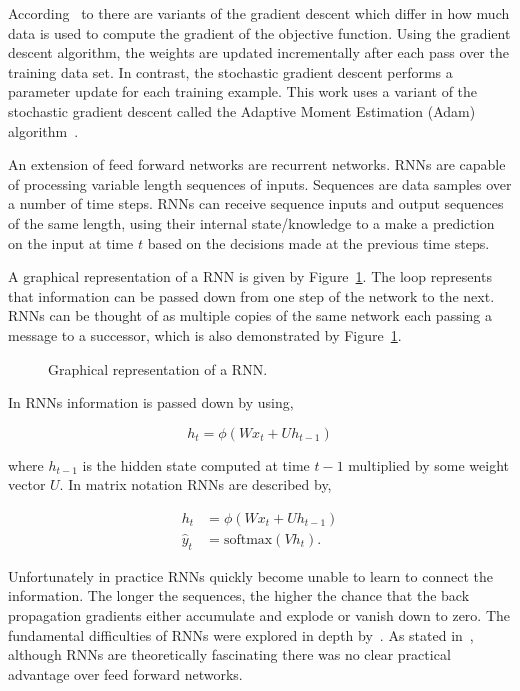 According~\cite{Ruder2016} to there are variants of the gradient descent which
differ in how much data is used to compute the gradient of the objective
function. Using the gradient descent algorithm, the weights are updated
incrementally after each pass over the training data set. In contrast, the
stochastic gradient descent performs a parameter update for each training
example. This work uses a variant of the stochastic gradient descent called the
Adaptive Moment Estimation (Adam) algorithm~\cite{Kingma2014}.

An extension of feed forward networks are recurrent networks. RNNs are
capable of processing variable length sequences of inputs. Sequences are data
samples over a number of time steps. RNNs can receive sequence inputs and output
sequences of the same length, using their internal state/knowledge to a make a
prediction on the input at time \(t\) based on the decisions made at the
previous time steps.

A graphical representation of a RNN is given by
Figure~\ref{fig:rnn}. The loop represents that information can be passed
down from one step of the network to the next. RNNs can be thought of as
multiple copies of the same network each passing a message to a successor, which
is also demonstrated by Figure~\ref{fig:rnn}.

\begin{figure}[!htbp]
    \centering
    
    \caption{Graphical representation of a RNN.}\label{fig:rnn}
\end{figure}

In RNNs information is passed down by using,

\begin{equation*}
    h_t = \phi(Wx_t + Uh_{t-1})
\end{equation*}

where \(h_{t-1}\) is the hidden state computed at time \(t-1\) multiplied by
some weight vector \(U\). In matrix notation RNNs are described by,

\begin{align}\label{eq:recurrent_neural_network_equations}
    h_t & = \phi(Wx_t + Uh_{t-1}) \\
    \hat{y}_t & = \text{softmax}(Vh_t).
\end{align}

Unfortunately in practice RNNs quickly become unable to learn to connect the
information. The longer the sequences, the higher the chance that
the back propagation gradients either accumulate and explode or vanish down to
zero. The fundamental difficulties of RNNs were explored in depth
by~\cite{Bengio1994}. As stated in~\cite{Hochreiter1997}, although RNNs are
theoretically fascinating there was no clear practical advantage over feed
forward networks.

